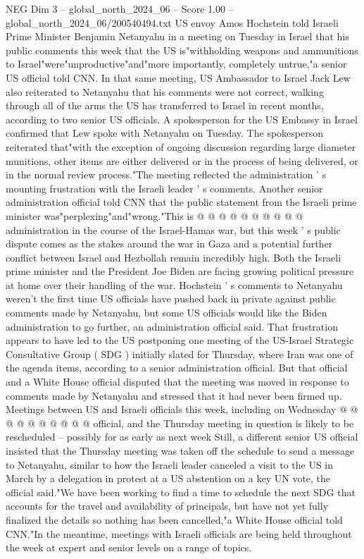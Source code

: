 \begin{textsample}{NEG Dim 3 – global\_north\_2024\_06 – Score 1.00 – global\_north\_2024\_06/200540494.txt}  \label{ex:f3_neg_385}
US envoy Amos Hochstein told Israeli Prime Minister Benjamin Netanyahu in a meeting on Tuesday in Israel that his public comments this week that the US is"withholding weapons and ammunitions to Israel"were"unproductive"and"more importantly, completely untrue,"a senior US official told CNN.
In that same meeting, US Ambassador to Israel Jack Lew also reiterated to Netanyahu that his comments were not correct, walking through all of the arms the US has transferred to Israel in recent months, according to two senior US officials.
A spokesperson for the US Embassy in Israel confirmed that Lew spoke with Netanyahu on Tuesday.
The spokesperson reiterated that"with the exception of ongoing discussion regarding large diameter munitions, other items are either delivered or in the process of being delivered, or in the normal review process."The meeting reflected the administration ' s mounting frustration with the Israeli leader ' s comments.
Another senior administration official told CNN that the public statement from the Israeli prime minister was"perplexing"and"wrong."This is @ @ @ @ @ @ @ @ @ @ administration in the course of the Israel-Hamas war, but this week ' s public dispute comes as the stakes around the war in Gaza and a potential further conflict between Israel and Hezbollah remain incredibly high.
Both the Israeli prime minister and the President Joe Biden are facing growing political pressure at home over their handling of the war.
Hochstein ' s comments to Netanyahu weren't the first time US officials have pushed back in private against public comments made by Netanyahu, but some US officials would like the Biden administration to go further, an administration official said.
That frustration appears to have led to the US postponing one meeting of the US-Israel Strategic Consultative Group ( SDG ) initially slated for Thursday, where Iran was one of the agenda items, according to a senior administration official.
But that official and a White House official disputed that the meeting was moved in response to comments made by Netanyahu and stressed that it had never been firmed up.
Meetings between US and Israeli officials this week, including on Wednesday @ @ @ @ @ @ @ @ @ @ official, and the Thursday meeting in question is likely to be rescheduled -- possibly for as early as next week Still, a different senior US official insisted that the Thursday meeting was taken off the schedule to send a message to Netanyahu, similar to how the Israeli leader canceled a visit to the US in March by a delegation in protest at a US abstention on a key UN vote, the official said."We have been working to find a time to schedule the next SDG that accounts for the travel and availability of principals, but have not yet fully finalized the details so nothing has been cancelled,"a White House official told CNN."In the meantime, meetings with Israeli officials are being held throughout the week at expert and senior levels on a range of topics.

\end{textsample}
